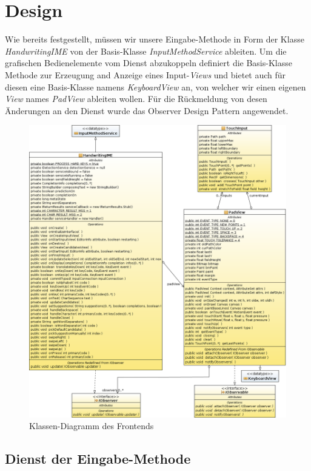 \section{Design}

Wie bereits festgestellt, müssen wir unsere Eingabe-Methode in Form der Klasse \emph{HandwritingIME} von der Basis-Klasse \emph{InputMethodService} ableiten. Um die grafischen Bedienelemente vom Dienst abzukoppeln definiert die Basis-Klasse Methode zur Erzeugung and Anzeige eines Input-\emph{Views} und bietet auch für diesen eine Basis-Klasse namens \emph{KeyboardView} an, von welcher wir einen eigenen \emph{View} names \emph{PadView} ableiten wollen. Für die Rückmeldung von desen Änderungen an den Dienst wurde das Observer Design Pattern angewendet\cite[S.293-303]{designpatterns}.

\begin{figure}[h!]
   \centering
   \includegraphics[width=\textwidth]{img/uml_cd_ime} 
   \caption{Klassen-Diagramm des Frontends}
   \label{fig:cd_ime}
\end{figure}

\subsection{Dienst der Eingabe-Methode}

